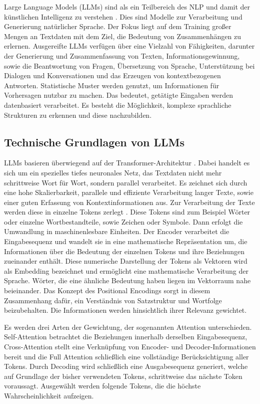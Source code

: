 Large Language Models (LLMs) sind als ein Teilbereich des NLP und damit der künstlichen Intelligenz zu verstehen \citep{Raiaan2024A}. Dies sind Modelle zur Verarbeitung und Generierung natürlicher Sprache. Der Fokus liegt auf dem Training großer Mengen an Textdaten mit dem Ziel, die Bedeutung von Zusammenhängen zu erlernen. Ausgereifte LLMs verfügen über eine Vielzahl von Fähigkeiten, darunter der Generierung und Zusammenfassung von Texten, Informationsgewinnung, sowie die Beantwortung von Fragen, Übersetzung von Sprache, Unterstützung bei Dialogen und Konversationen und das Erzeugen von kontextbezogenen Antworten. Statistische Muster werden genutzt, um Informationen für Vorhersagen nutzbar zu machen. Das bedeutet, getätigte Eingaben werden datenbasiert verarbeitet. Es besteht die Möglichkeit, komplexe sprachliche Strukturen zu erkennen und diese nachzubilden. 

\subsection{Technische Grundlagen von LLMs}
LLMs basieren überwiegend auf der Transformer-Architektur \citep{vaswani2017attention}. Dabei handelt es sich um ein spezielles tiefes neuronales Netz, das Textdaten nicht mehr schrittweise Wort für Wort, sondern parallel verarbeitet. Es zeichnet sich durch eine hohe Skalierbarkeit, parallele und effiziente Verarbeitung langer Texte, sowie einer guten Erfassung von Kontextinformationen aus. 
Zur Verarbeitung der Texte werden diese in einzelne Tokens zerlegt \citep{grum2022construction, vaswani2017attention}. Diese Tokens sind zum Beispiel Wörter oder einzelne Wortbestandteile, sowie Zeichen oder Symbole. Dann erfolgt die Umwandlung in maschinenlesbare Einheiten. Der Encoder verarbeitet die Eingabesequenz und wandelt sie in eine mathematische Repräsentation um, die Informationen über die Bedeutung der einzelnen Tokens und ihre Beziehungen zueinander enthält. 
Diese numerische Darstellung der Tokens als Vektoren wird als Embedding bezeichnet und ermöglicht eine mathematische Verarbeitung der Sprache. Wörter, die eine ähnliche Bedeutung haben liegen im Vektorraum nahe beieinander. Das Konzept des Positional Encodings sorgt in diesem Zusammenhang dafür, ein Verständnis von Satzstruktur und Wortfolge beizubehalten. Die Informationen werden hinsichtlich ihrer Relevanz gewichtet. 

Es werden drei Arten der Gewichtung, der sogenannten Attention unterschieden. Self-Attention betrachtet die Beziehungen innerhalb derselben Eingabesequenz, Cross-Attention stellt eine Verknüpfung von Encoder- und Decoder-Informationen bereit und die Full Attention schließlich eine vollständige Berücksichtigung aller Tokens. Durch Decoding wird schließlich eine Ausgabesequenz generiert, welche auf Grundlage der bisher verwendeten Tokens, schrittweise das nächste Token voraussagt. Ausgewählt werden folgende Tokens, die die höchste Wahrscheinlichkeit aufzeigen.

